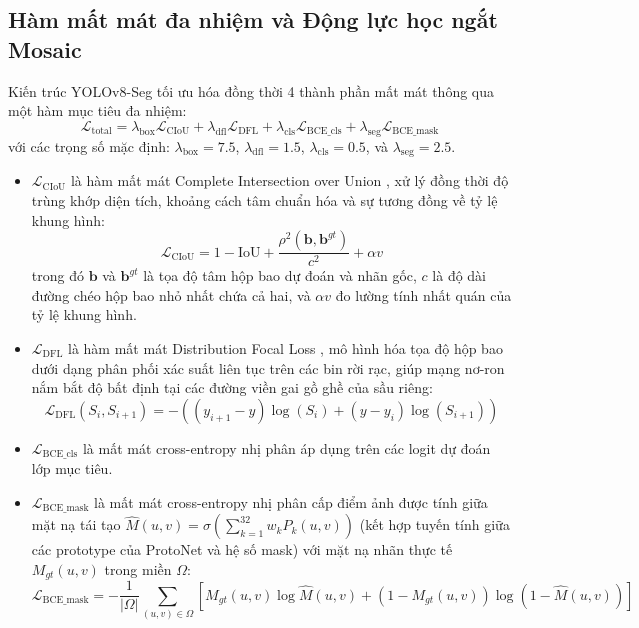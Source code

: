 \documentclass[12pt,a4paper]{article}
\begin{document}
\subsection{Hàm mất mát đa nhiệm và Động lực học ngắt Mosaic}
Kiến trúc YOLOv8-Seg tối ưu hóa đồng thời 4 thành phần mất mát thông qua một hàm mục tiêu đa nhiệm:
\begin{equation}
\mathcal{L}_{\text{total}} = \lambda_{\text{box}} \mathcal{L}_{\text{CIoU}} + \lambda_{\text{dfl}} \mathcal{L}_{\text{DFL}} + \lambda_{\text{cls}} \mathcal{L}_{\text{BCE\_cls}} + \lambda_{\text{seg}} \mathcal{L}_{\text{BCE\_mask}}
\label{eq:total_loss}
\end{equation}
với các trọng số mặc định: $\lambda_{\text{box}} = 7.5$, $\lambda_{\text{dfl}} = 1.5$, $\lambda_{\text{cls}} = 0.5$, và $\lambda_{\text{seg}} = 2.5$.
\begin{itemize}
    \item $\mathcal{L}_{\text{CIoU}}$ là hàm mất mát Complete Intersection over Union \cite{zheng2020ciou}, xử lý đồng thời độ trùng khớp diện tích, khoảng cách tâm chuẩn hóa và sự tương đồng về tỷ lệ khung hình:
    \begin{equation}
    \mathcal{L}_{\text{CIoU}} = 1 - \text{IoU} + \frac{\rho^2(\mathbf{b}, \mathbf{b}^{gt})}{c^2} + \alpha v
    \end{equation}
    trong đó $\mathbf{b}$ và $\mathbf{b}^{gt}$ là tọa độ tâm hộp bao dự đoán và nhãn gốc, $c$ là độ dài đường chéo hộp bao nhỏ nhất chứa cả hai, và $\alpha v$ đo lường tính nhất quán của tỷ lệ khung hình.
    
    \item $\mathcal{L}_{\text{DFL}}$ là hàm mất mát Distribution Focal Loss \cite{li2020generalized}, mô hình hóa tọa độ hộp bao dưới dạng phân phối xác suất liên tục trên các bin rời rạc, giúp mạng nơ-ron nắm bắt độ bất định tại các đường viền gai gồ ghề của sầu riêng:
    \begin{equation}
    \mathcal{L}_{\text{DFL}}(S_i, S_{i+1}) = - \left( (y_{i+1} - y) \log(S_i) + (y - y_i) \log(S_{i+1}) \right)
    \end{equation}
    
    \item $\mathcal{L}_{\text{BCE\_cls}}$ là mất mát cross-entropy nhị phân áp dụng trên các logit dự đoán lớp mục tiêu.
    
    \item $\mathcal{L}_{\text{BCE\_mask}}$ là mất mát cross-entropy nhị phân cấp điểm ảnh được tính giữa mặt nạ tái tạo $\hat{M}(u, v) = \sigma\left(\sum_{k=1}^{32} w_k P_k(u, v)\right)$ (kết hợp tuyến tính giữa các prototype của ProtoNet và hệ số mask) với mặt nạ nhãn thực tế $M_{gt}(u, v)$ trong miền $\Omega$:
    \begin{equation}
    \mathcal{L}_{\text{BCE\_mask}} = -\frac{1}{|\Omega|} \sum_{(u,v) \in \Omega} \left[ M_{gt}(u,v) \log \hat{M}(u,v) + (1 - M_{gt}(u,v)) \log (1 - \hat{M}(u,v)) \right]
    \end{equation}
\end{itemize}
\end{document}
